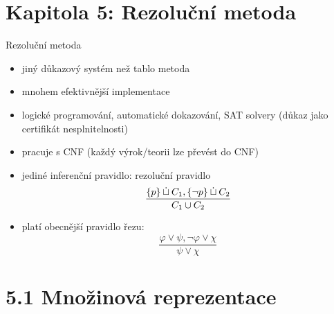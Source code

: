 \documentclass{beamer}
\begin{document}
    



\section{\sc Kapitola 5: Rezoluční metoda}


\begin{frame}{Rezoluční metoda}
    
    \begin{itemize}[<+->]
        \item jiný důkazový systém než tablo metoda
        \item mnohem efektivnější implementace
        \item logické programování, automatické dokazování, SAT solvery (důkaz jako \alert{certifikát} nesplnitelnosti)
        \item pracuje s CNF (každý výrok/teorii lze převést do CNF)
        \item jediné inferenční pravidlo: \alert{rezoluční pravidlo}
        $$
        \frac{\{p\}\mathbin{\dot{\sqcup}} C_1,\{\neg p\}\mathbin{\dot{\sqcup}} C_2}{C_1\cup C_2}
        $$
        \item platí obecnější \alert{pravidlo řezu}:
        $$
        \frac{\varphi\lor\psi,\neg\varphi\lor\chi}{\psi\lor\chi}
        $$
    \end{itemize}

\end{frame}


\section{5.1 Množinová reprezentace}
\end{document}
